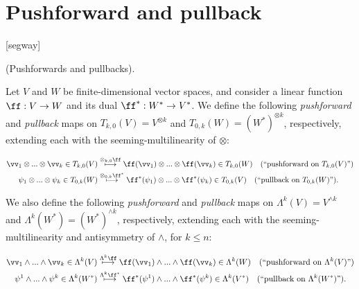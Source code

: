 \section{Pushforward and pullback}

[segway]

\begin{defn}
\label{ch::exterior_powers::defn::pushforward_pullback}
    (Pushforwards and pullbacks).
    
    Let $V$ and $W$ be finite-dimensional vector spaces, and consider a linear function $\ff:V \rightarrow W$ and its dual ${\ff^*:W^* \rightarrow V^*}$. We define the following \textit{pushforward} and \textit{pullback} maps on ${T_{k,0}(V) = V^{\otimes k}}$ and ${T_{0,k}(W) = (W^*)^{\otimes k}}$, respectively, extending each with the seeming-multilinearity of $\otimes$:
    
    \begin{align*}
        \vv_1 \otimes ... \otimes \vv_k \in T_{k,0}(V) &\overset{\otimes_{k, 0} \ff}{\longmapsto} \ff(\vv_1) \otimes ... \otimes \ff(\vv_k) \in T_{k,0}(W) \quad \text{(``pushforward on $T_{k,0}(V)$'')} \\
        \psi_1 \otimes ... \otimes \psi_k \in T_{0,k}(W) &\overset{\otimes_{0, k} \ff^*}{\longmapsto} \ff^*(\psi_1) \otimes ... \otimes \ff^*(\psi_k) \in T_{0,k}(V) \quad \text{(``pullback on $T_{0,k}(W)$'')}.
    \end{align*}
    
    We also define the following \textit{pushforward} and \textit{pullback} maps on $\Lambda^k(V) = V^{\wedge k}$ and $\Lambda^k(W^*) = (W^*)^{\wedge k}$, respectively, extending each with the seeming-multilinearity and antisymmetry of $\wedge$, for $k \leq n$:
    
    \begin{align*}
        \vv_1 \wedge ... \wedge \vv_k \in \Lambda^k(V) &\overset{\Lambda^k \ff}{\longmapsto} \ff(\vv_1) \wedge ... \wedge \ff(\vv_k) \in \Lambda^k(W) \quad \text{(``pushforward on $\Lambda^k(V)$'')} \\
        \psi^1 \wedge ... \wedge \psi^k \in \Lambda^k(W^*) &\overset{\Lambda^k \ff^*}{\longmapsto} \ff^*(\psi^1) \wedge ... \wedge \ff^*(\psi^k) \in \Lambda^k(V^*) \quad \text{(``pullback on $\Lambda^k(W^*)$'')}.
    \end{align*}
\end{defn}

